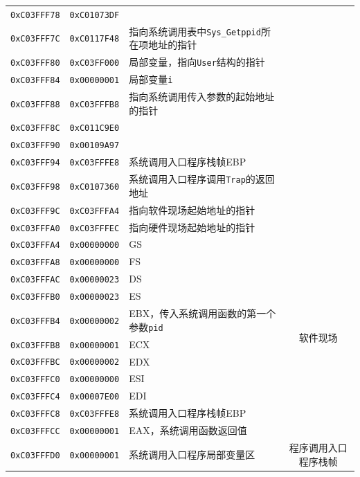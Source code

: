 \begin{table}[htbp]
\begin{threeparttable}[b]
\begin{tabular}{cllc}
\texttt{0xC03FFF78}&\texttt{0xC01073DF}&        & \\
\texttt{0xC03FFF7C}&\texttt{0xC0117F48}&  指向系统调用表中\texttt{Sys\_Getppid}所在项地址的指针      & \\
\texttt{0xC03FFF80}&\texttt{0xC03FF000}&  局部变量，指向\texttt{User}结构的指针      & \\
\texttt{0xC03FFF84}&\texttt{0x00000001}&  局部变量\texttt{i}  & \\
\texttt{0xC03FFF88}&\texttt{0xC03FFFB8}&  指向系统调用传入参数的起始地址的指针      & \\
\texttt{0xC03FFF8C}&\texttt{0xC011C9E0}&        & \\
\texttt{0xC03FFF90}&\texttt{0x00109A97}&        & \\
           \texttt{0xC03FFF94}&\texttt{0xC03FFFE8}& 系统调用入口程序栈帧EBP&\\
           \texttt{0xC03FFF98}&\texttt{0xC0107360}& 系统调用入口程序调用\texttt{Trap}的返回地址    \\
           \texttt{0xC03FFF9C}&\texttt{0xC03FFFA4}&指向软件现场起始地址的指针\\
           \texttt{0xC03FFFA0}&\texttt{0xC03FFFEC}&指向硬件现场起始地址的指针 \\\midrule
           \texttt{0xC03FFFA4}&\texttt{0x00000000}&GS  &\multirow{11}{*}{软件现场} \\
           \texttt{0xC03FFFA8}&\texttt{0x00000000}&FS   \\
           \texttt{0xC03FFFAC}&\texttt{0x00000023}&DS   \\
           \texttt{0xC03FFFB0}&\texttt{0x00000023}&ES   \\
           \texttt{0xC03FFFB4}&\texttt{0x00000002}&EBX，传入系统调用函数的第一个参数\texttt{pid}\tnote{$\dagger$}  \\
           \texttt{0xC03FFFB8}&\texttt{0x00000001}&ECX  \\
           \texttt{0xC03FFFBC}&\texttt{0x00000002}&EDX  \\
           \texttt{0xC03FFFC0}&\texttt{0x00000000}&ESI  \\
           \texttt{0xC03FFFC4}&\texttt{0x00007E00}&EDI  \\
           \texttt{0xC03FFFC8}&\texttt{0xC03FFFE8}&系统调用入口程序栈帧EBP  \\
           \texttt{0xC03FFFCC}&\texttt{0x00000001}&EAX，系统调用函数返回值  \\\midrule
           \texttt{0xC03FFFD0}&\texttt{0x00000001}&  \multirow{6}{*}{系统调用入口程序局部变量区}    &\multirow{7}{*}{程序调用入口程序栈帧}\\

\end{tabular}
\end{threeparttable}
\end{table}
